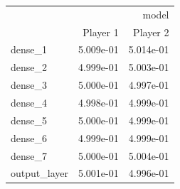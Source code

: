 \begin{tabular}{lrr}
\toprule
 & \multicolumn{2}{r}{model} \\
 & Player 1 & Player 2 \\
\midrule
dense\_1 & 5.009e-01 & 5.014e-01 \\
dense\_2 & 4.999e-01 & 5.003e-01 \\
dense\_3 & 5.000e-01 & 4.997e-01 \\
dense\_4 & 4.998e-01 & 4.999e-01 \\
dense\_5 & 5.000e-01 & 4.999e-01 \\
dense\_6 & 4.999e-01 & 4.999e-01 \\
dense\_7 & 5.000e-01 & 5.004e-01 \\
output\_layer & 5.001e-01 & 4.996e-01 \\
\bottomrule
\end{tabular}
